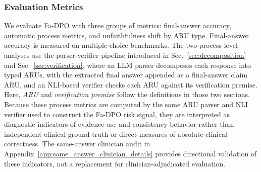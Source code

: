 \documentclass[a4paper,fleqn,doubleblind]{cas-sc}
\begin{document}
\subsubsection{Evaluation Metrics}
\label{subsubsec:eval_metrics}
We evaluate Fa-DPO with three groups of metrics: final-answer accuracy, automatic process metrics, and unfaithfulness shift by ARU type. Final-answer accuracy is measured on multiple-choice benchmarks. The two process-level analyses use the parser-verifier pipeline introduced in Sec.~\ref{sec:decomposition} and Sec.~\ref{sec:verification}, where an LLM parser decomposes each response into typed ARUs, with the extracted final answer appended as a final-answer claim ARU, and an NLI-based verifier checks each ARU against its verification premise. Here, \emph{ARU} and \emph{verification premise} follow the definitions in those two sections. Because these process metrics are computed by the same ARU parser and NLI verifier used to construct the Fa-DPO risk signal, they are interpreted as diagnostic indicators of evidence-use and consistency behavior rather than independent clinical ground truth or direct measures of absolute clinical correctness. The same-answer clinician audit in Appendix~\ref{app:same_answer_clinician_details} provides directional validation of these indicators, not a replacement for clinician-adjudicated evaluation.
\end{document}
